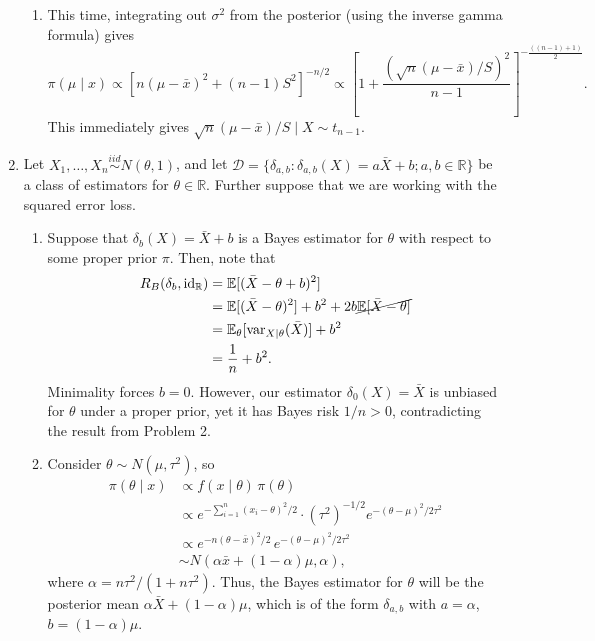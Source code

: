 \documentclass[11pt]{article}
\newcommand{\R}{\mathbb{R}}
\newcommand{\EE}{\mathbb{E}}
\begin{document}
\begin{enumerate}
\begin{enumerate}
            \item This time, integrating out $\sigma^2$ from the posterior
            (using the inverse gamma formula) gives \[
                \pi(\mu\mid x)
                    \propto \left[n(\mu - \bar{x})^2 + (n - 1)S^2\right]^{-n / 2}
                    \propto \left[1 + \frac{(\sqrt{n}(\mu - \bar{x}) / S)^2}{n - 1}\right]^{-\frac{((n - 1) + 1)}{2}}.
            \] This immediately gives $\sqrt{n}(\mu - \bar{x}) / S \mid X \sim
            t_{n - 1}$.
        \end{enumerate}


        \item Let $X_1, \dots, X_n \overset{iid}{\sim} N(\theta, 1)$, and let
        $\mathscr{D} = \{\delta_{a, b}\colon \delta_{a, b}(X) = a\bar{X} + b;
        a, b \in \R\}$ be a class of estimators for $\theta \in \R$.
        Further suppose that we are working with the squared error loss.

        \begin{enumerate}
            \item Suppose that $\delta_b(X) = \bar{X} + b$ is a Bayes estimator
            for $\theta$ with respect to some proper prior $\pi$.
            Then, note that \begin{align*}
                R_B(\delta_b, \text{id}_\R)
                    &= \EE[(\bar{X} - \theta + b)^2] \\
                    &= \EE[(\bar{X} - \theta)^2] + b^2 + 2b \cancel{\EE[\bar{X} - \theta]} \\
                    &= \EE_\theta[\text{var}_{X\mid \theta}(\bar{X})] + b^2 \\
                    &= \frac{1}{n} + b^2.
            \end{align*}
            Minimality forces $b = 0$.
            However, our estimator $\delta_0(X) = \bar{X}$ is unbiased for
            $\theta$ under a proper prior, yet it has Bayes risk $1 / n > 0$,
            contradicting the result from Problem 2.


            \item Consider $\theta \sim N(\mu, \tau^2)$, so \begin{align*}
                \pi(\theta\mid x)
                    &\propto f(x \mid \theta)\,\pi(\theta) \\
                    &\propto e^{-\sum_{i = 1}^n (x_i - \theta)^2 / 2} \cdot (\tau^2)^{-1/2} e^{-(\theta - \mu)^2 / 2\tau^2} \\
                    &\propto e^{-n(\theta - \bar{x})^2 / 2} \,e^{-(\theta - \mu)^2 / 2\tau^2} \\
                    &\sim N\left(\alpha \bar{x} + (1 - \alpha) \mu, \alpha\right),
            \end{align*}
            where $\alpha = n\tau^2 / (1 + n\tau^2)$.
            Thus, the Bayes estimator for $\theta$ will be the posterior mean
            $\alpha\bar{X} + (1 - \alpha)\mu$, which is of the form $\delta_{a,
            b}$ with $a = \alpha$, $b = (1 - \alpha) \mu$.


\end{enumerate}
\end{enumerate}
\end{document}
